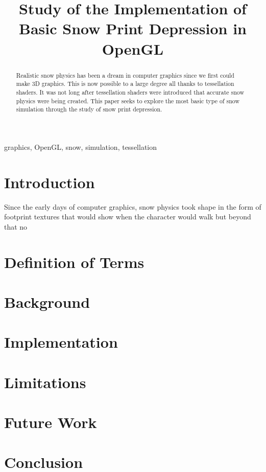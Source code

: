 \documentclass[conference]{IEEEtran}
\begin{document}
\title{Study of the Implementation of Basic Snow Print Depression in OpenGL}

\author{
\and
{}
}

\maketitle

\begin{abstract}
Realistic snow physics has been a dream in computer graphics since we first could make 3D graphics. This is now possible to a large degree all thanks to tessellation shaders. It was not long after tessellation shaders were introduced that accurate snow physics were being created. This paper seeks to explore the most basic type of snow simulation through the study of snow print depression.
\end{abstract}

\begin{IEEEkeywords}
graphics, OpenGL, snow, simulation, tessellation
\end{IEEEkeywords}

\section{Introduction}
Since the early days of computer graphics, snow physics took shape in the form of footprint textures that would show when the character would walk but beyond that no

\section{Definition of Terms}


\section{Background}


\section{Implementation}


\section{Limitations}


\section{Future Work}


\section{Conclusion}


\printbibliography
\end{document}
